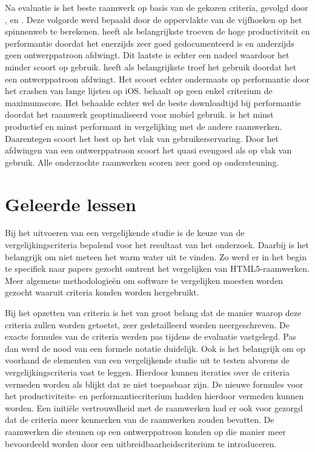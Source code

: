 Na evaluatie is \jqm{} het beste raamwerk op basis van de gekozen criteria, gevolgd door \kendo{}, \lungo{} en \st{}.
Deze volgorde werd bepaald door de oppervlakte van de vijfhoeken op het spinnenweb te berekenen.
\jqm{} heeft als belangrijkste troeven de hoge productiviteit en performantie doordat het enerzijds zeer goed gedocumenteerd is en anderzijds geen ontwerppatroon afdwingt.
Dit laatste is echter een nadeel waardoor het minder scoort op gebruik.
\kendo{} heeft als belangrijkste troef het gebruik doordat het een ontwerppatroon afdwingt.
Het scoort echter ondermaats op performantie door het crashen van lange lijsten op iOS.
\lungo{} behaalt op geen enkel criterium de maximumscore.
Het behaalde echter wel de beste downloadtijd bij performantie doordat het raamwerk geoptimaliseerd voor mobiel gebruik.
\st{} is het minst productief en minst performant in vergelijking met de andere raamwerken.
Daarentegen scoort \st{} het best op het vlak van gebruikerservaring.
Door het afdwingen van een ontwerppatroon scoort het quasi evengoed als \kendo{} op vlak van gebruik.
Alle onderzochte raamwerken scoren zeer goed op ondersteuning.


\section{Geleerde lessen} %
Bij het uitvoeren van een vergelijkende studie is de keuze van de vergelijkingscriteria bepalend voor het resultaat van het onderzoek.
Daarbij is het belangrijk om niet meteen het warm water uit te vinden.
Zo werd er in het begin te specifiek naar papers gezocht omtrent het vergelijken van HTML5-raamwerken.
Meer algemene methodologieën om software te vergelijken moesten worden gezocht waaruit criteria konden worden hergebruikt.

Bij het opzetten van criteria is het van groot belang dat de manier waarop deze criteria zullen worden getoetst, zeer gedetailleerd worden neergeschreven.
De exacte formules van de criteria werden pas tijdens de evaluatie vastgelegd.
Pas dan werd de nood van een formele notatie duidelijk.
Ook is het belangrijk om op voorhand de elementen van een vergelijkende studie uit te testen alvorens de vergelijkingscriteria vast te leggen.
Hierdoor kunnen iteraties over de criteria vermeden worden als blijkt dat ze niet toepasbaar zijn.
De nieuwe formules voor het productiviteits- en performantiecriterium hadden hierdoor vermeden kunnen worden.
Een initiële vertrouwdheid met de raamwerken had er ook voor gezorgd dat de criteria meer kenmerken van de raamwerken zouden bevatten.
De raamwerken die steunen op een ontwerppatroon konden op die manier meer bevoordeeld worden door een uitbreidbaarheidscriterium te introduceren.

